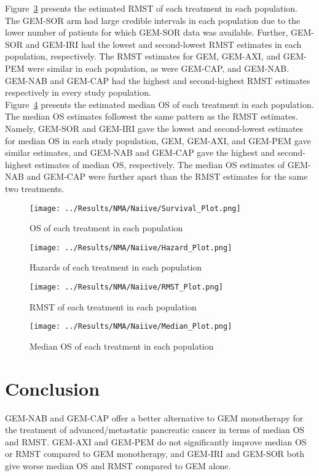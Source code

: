 Figure~\ref{fig:pred_rmst} presents the estimated RMST of each treatment in each population. The GEM-SOR arm had large credible intervals in each population due to the lower number of patients for which GEM-SOR data was available. Further, GEM-SOR and GEM-IRI had the lowest and second-lowest RMST estimates in each population, respectively. The RMST estimates for GEM, GEM-AXI, and GEM-PEM were similar in each population, as were GEM-CAP, and GEM-NAB. GEM-NAB and GEM-CAP had the highest and second-highest RMST estimates respectively in every study population. \\

Figure~\ref{fig:pred_median} presents the estimated median OS of each treatment in each population. The median OS estimates followest the same pattern as the RMST estimates. Namely, GEM-SOR and GEM-IRI gave the lowest and second-lowest estimates for median OS in each study population, GEM, GEM-AXI, and GEM-PEM gave similar estimates, and GEM-NAB and GEM-CAP gave the highest and second-highest estimates of median OS, respectively. The median OS estimates of GEM-NAB and GEM-CAP were further apart than the RMST estimates for the same two treatments. 

\begin{figure}[h]
    \centering
    \texttt{[image: ../Results/NMA/Naiive/Survival\_Plot.png]}
    \caption{OS of each treatment in each population}
    \label{fig:pred_surv}
\end{figure}

\begin{figure}[h]
    \centering
    \texttt{[image: ../Results/NMA/Naiive/Hazard\_Plot.png]}
    \caption{Hazards of each treatment in each population}
    \label{fig:pred_hazard}
\end{figure}

\begin{figure}[h]
    \centering
    \texttt{[image: ../Results/NMA/Naiive/RMST\_Plot.png]}
    \caption{RMST of each treatment in each population}
    \label{fig:pred_rmst}
\end{figure}

\begin{figure}[h]
    \centering
    \texttt{[image: ../Results/NMA/Naiive/Median\_Plot.png]}
    \caption{Median OS of each treatment in each population}
    \label{fig:pred_median}
\end{figure}

\section{Conclusion}
GEM-NAB and GEM-CAP offer a better alternative to GEM monotherapy for the treatment of advanced/metastatic pancreatic cancer in terms of median OS and RMST. GEM-AXI and GEM-PEM do not significantly improve median OS or RMST compared to GEM monotherapy, and GEM-IRI and GEM-SOR both give worse median OS and RMST compared to GEM alone. 
